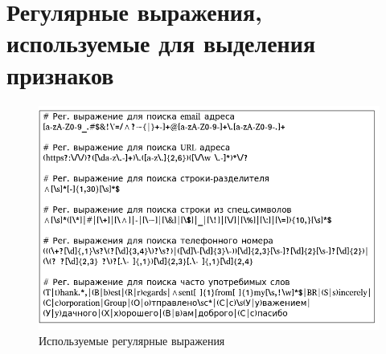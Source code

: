 \chapter{Регулярные выражения, используемые для выделения признаков}
\label{cha:appendix1}
\begin{figure}[h]
	\centering{}
	\includegraphics[width=\textwidth]{inc/img/reg_exp.png}
	\caption{Используемые регулярные выражения}
\end{figure}


